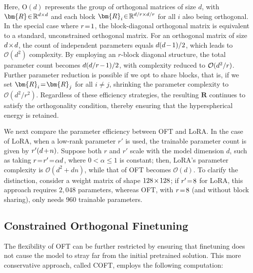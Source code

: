 Here, $\text{O}(d)$ represents the group of orthogonal matrices of size $d$, with $\thickmuskip=2mu \medmuskip=2mu \bm{R}\in\mathbb{R}^{d\times d}$ and each block $\thickmuskip=2mu \medmuskip=2mu \bm{R}_i\in\mathbb{R}^{d/r\times d/r}$ for all $i$ also being orthogonal. In the special case where $\thickmuskip=2mu \medmuskip=2mu r=1$, the block-diagonal orthogonal matrix is equivalent to a standard, unconstrained orthogonal matrix. For an orthogonal matrix of size $\thickmuskip=2mu \medmuskip=2mu d\times d$, the count of independent parameters equals $\thickmuskip=2mu \medmuskip=2mu d(d-1)/2$, which leads to $\mathcal{O}(d^2)$ complexity. By employing an $r$-block diagonal structure, the total parameter count becomes $\thickmuskip=2mu \medmuskip=2mu d(d/r-1)/2$, with complexity reduced to $\thickmuskip=2mu \medmuskip=2mu \mathcal{O}(d^2/r)$. Further parameter reduction is possible if we opt to share blocks, that is, if we set $\thickmuskip=2mu \medmuskip=2mu\bm{R}_i=\bm{R}_j$ for all $i\neq j$, shrinking the parameter complexity to $\mathcal{O}(d^2/r^2)$. Regardless of these efficiency strategies, the resulting $\bm{R}$ continues to satisfy the orthogonality condition, thereby ensuring that the hyperspherical energy is retained.

We next compare the parameter efficiency between OFT and LoRA. In the case of LoRA, when a low-rank parameter $r'$ is used, the trainable parameter count is given by $\thickmuskip=2mu \medmuskip=2mu r'(d+n)$. Suppose both $r$ and $r'$ scale with the model dimension $d$, such as taking $\thickmuskip=2mu \medmuskip=2mu r=r'=\alpha d$, where $0<\alpha\leq 1$ is constant; then, LoRA's parameter complexity is $\mathcal{O}(d^2+dn)$, while that of OFT becomes $\mathcal{O}(d)$. To clarify the distinction, consider a weight matrix of shape $\thickmuskip=2mu \medmuskip=2mu 128\times 128$; if $\thickmuskip=2mu \medmuskip=2mu r'=8$ for LoRA, this approach requires $2,048$ parameters, whereas OFT, with $\thickmuskip=2mu \medmuskip=2mu r=8$ (and without block sharing), only needs $960$ trainable parameters.

\subsection{Constrained Orthogonal Finetuning}

The flexibility of OFT can be further restricted by ensuring that finetuning does not cause the model to stray far from the initial pretrained solution. This more conservative approach, called COFT, employs the following computation:

